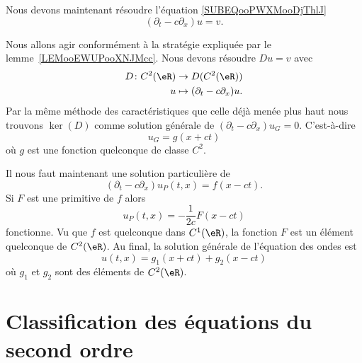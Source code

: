 Nous devons maintenant résoudre l'équation \eqref{SUBEQooPWXMooDjThlJ}
\begin{equation}
	(\partial_t-c\partial_x)u=v.
\end{equation}

Nous allons agir conformément à la stratégie expliquée par le lemme~\ref{LEMooEWUPooXNJMcc}. Nous devons résoudre \( Du=v\) avec
\begin{equation}
	\begin{aligned}
		D\colon C^2(\eR) & \to D(C^2(\eR))                    \\
		u                & \mapsto (\partial_t-c\partial_x)u.
	\end{aligned}
\end{equation}
Par la même méthode des caractéristiques que celle déjà menée plus haut nous trouvons \( \ker(D)\) comme solution générale de \( (\partial_t-c\partial_x)u_G=0\). C'est-à-dire
\begin{equation}
	u_G=g(x+ct)
\end{equation}
où \( g\) est une fonction quelconque de classe \( C^2\).

Il nous faut maintenant une solution particulière de
\begin{equation}
	(\partial_t-c\partial_x)u_P(t,x)=f(x-ct).
\end{equation}
Si \( F\) est une primitive de \( f\) alors
\begin{equation}
	u_P(t,x)=-\frac{ 1 }{ 2c }F(x-ct)
\end{equation}
fonctionne. Vu que \( f\) est quelconque dans \( C^1(\eR)\), la fonction \( F\) est un élément quelconque de \( C^2(\eR)\). Au final, la solution générale de l'équation des ondes est
\begin{equation}
	u(t,x)=g_1(x+ct)+g_2(x-ct)
\end{equation}
où \( g_1\) et \( g_2\) sont des éléments de \( C^2(\eR)\).

\section{Classification des équations du second ordre}

